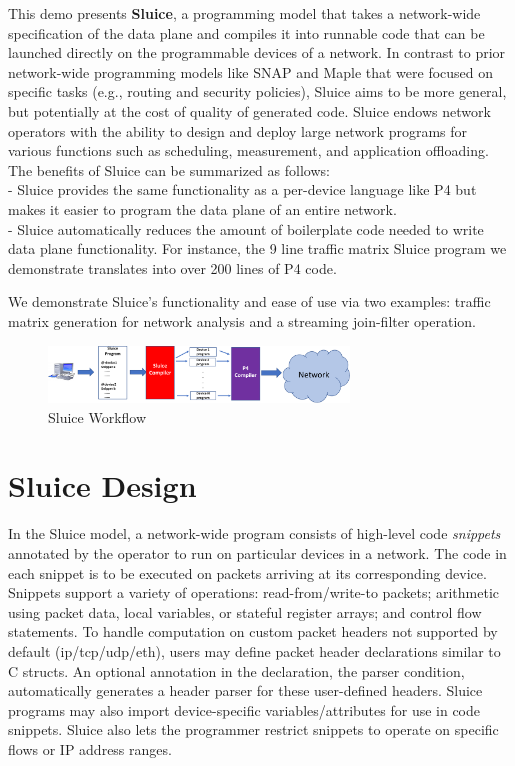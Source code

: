 This demo presents \textbf{Sluice}, a programming model that takes a
network-wide specification of the data plane and compiles it into runnable code
that can be launched directly on the programmable devices of a network. In
contrast to prior network-wide programming models like SNAP and Maple that were
focused on specific tasks (e.g., routing and security policies), Sluice aims to
be more general, but potentially at the cost of quality of generated code.
Sluice endows network operators with the ability to design and deploy large
network programs for various functions such as scheduling, measurement, and
application offloading.  The benefits of Sluice can be summarized as follows:\\
\indent - Sluice provides the same functionality as a per-device language like
P4 but makes it easier to program the data plane of an entire network. \\
\indent - Sluice automatically reduces the amount of boilerplate code needed to
write data plane functionality. For instance, the 9 line traffic matrix Sluice
program we demonstrate translates into over 200 lines of P4 code.

We demonstrate Sluice's functionality and ease of use
via two examples: traffic matrix generation for network analysis and a
streaming join-filter operation.
\begin{figure}[tp]
\centering
\includegraphics[width=80mm,scale=0.7]{figures/sluice_workflow.pdf}
\caption{Sluice Workflow}
\vspace{-8mm}
\end{figure}
\vspace{-4mm}

\section{Sluice Design}
In the Sluice model, a network-wide program consists of high-level code
\textit{snippets} annotated by the operator to run on particular devices in a
network. The code in each snippet is to be executed on packets arriving at its
corresponding device. Snippets support a variety of operations:
read-from/write-to packets; arithmetic using packet data, local variables, or
stateful register arrays; and control flow statements. To handle computation on
custom packet headers not supported by default (ip/tcp/udp/eth), users may
define packet header declarations similar to C structs. An optional annotation
in the declaration, the parser condition, automatically generates a header
parser for these user-defined headers. Sluice programs may also import
device-specific variables/attributes for use in code snippets. Sluice also lets
the programmer restrict snippets to operate on specific flows or IP address
ranges.

